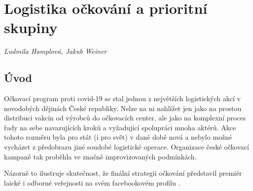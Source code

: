
\chapter{Logistika očkování a prioritní skupiny}\label{Logistika_ockovani}

\textit{Ludmila Hamplová, Jakub Weiner}
\vspace{15mm}


\section*{Úvod} %
Očkovací program proti covid-19 se stal jednou z největších logistických akcí v novodobých dějinách České republiky. Nelze na ni nahlížet jen jako na prostou distribuci vakcín od výrobců do očkovacích center, ale jako na komplexní proces řady na sebe navazujících kroků a vyžadující spolupráci mnoha aktérů. Akce tohoto rozměru byla pro stát (i pro svět) v dané době nová a nebylo možné vycházet z předobrazu jiné soudobé logistické operace. Organizace české očkovací kampaně tak proběhla ve značně improvizovaných podmínkách. %


    
Názorně to ilustruje skutečnost, že finální strategii očkování představil premiér laické i odborné veřejnosti na svém facebookovém profilu \cite{logoc_caulidi}. 


